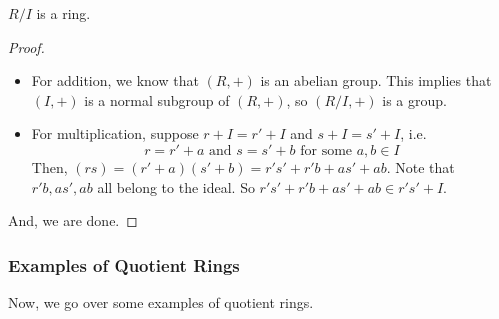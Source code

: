 \documentclass[letterpaper]{article}
\begin{document}
\begin{proposition}
    $R / I$ is a ring. 
\end{proposition}

\begin{mdframed}[]
    \begin{proof}
        \begin{itemize}
            \item For addition, we know that $(R, +)$ is an abelian group. This implies that $(I, +)$ is a normal subgroup of $(R, +)$, so $(R / I, +)$ is a group.
            \item For multiplication, suppose $r + I = r' + I$ and $s + I = s' + I$, i.e.
            \[r = r' + a \text{ and } s = s' + b \text{ for some } a, b \in I\]
            Then, $(rs) = (r' + a)(s' + b) = r's' + r'b + as' + ab$. Note that $r'b, as', ab$ all belong to the ideal. So $r's' + r'b + as' + ab \in r's' + I$.
        \end{itemize}
        And, we are done. 
    \end{proof}
\end{mdframed}




\subsubsection{Examples of Quotient Rings}
Now, we go over some examples of quotient rings. 
\end{document}
